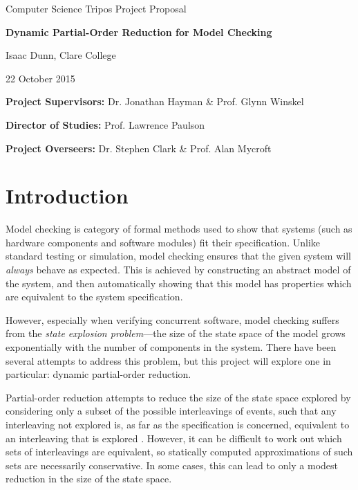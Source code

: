 \documentclass[12pt,a4paper,twoside]{article}
\begin{document}
\centerline{\Large Computer Science Tripos Project Proposal}
\vspace{0.4in}
\centerline{\LARGE\bf Dynamic Partial-Order Reduction for Model Checking}
\vspace{0.4in}
\centerline{\large Isaac Dunn, Clare College}
\vspace{0.3in}
\centerline{\large 22 October 2015}

\vfil


\noindent
{\bf Project Supervisors:} Dr. Jonathan Hayman \& Prof. Glynn Winskel
\vspace{0.2in}

\noindent
{\bf Director of Studies:} Prof. Lawrence Paulson
\vspace{0.2in}
\noindent
 
\noindent
{\bf Project Overseers:} Dr. Stephen Clark  \& Prof. Alan Mycroft



\section*{Introduction}

Model checking is category of formal methods used to show that systems
(such as hardware components and software modules) fit their specification.
Unlike standard testing or simulation, model checking ensures that the given
system will \emph{always} behave as expected. This is achieved by constructing
an abstract model of the system, and then automatically showing that this
model has properties which are equivalent to the system specification.

However, especially when verifying concurrent software, model checking suffers
from the \emph{state explosion problem}---the size of the state space of the model
grows exponentially with the number of components in the system. There have been
several attempts to address this problem, but this project will explore one in particular:
dynamic partial-order reduction.

Partial-order reduction attempts to reduce the size of the state space explored by
considering only a subset of the possible interleavings of events, such that any interleaving
not explored is, as far as the specification is concerned, equivalent to an interleaving
that is explored \cite{cgmp98}. However, it can be difficult to work out which sets of
interleavings are equivalent, so statically computed approximations of such sets are necessarily
conservative. In some cases, this can lead to only a modest reduction in the size of the
state space.
\end{document}
